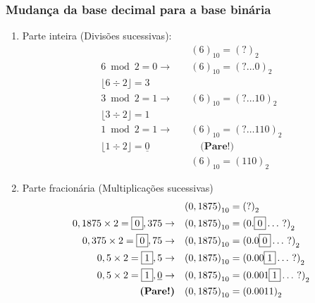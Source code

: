 \documentclass[a4paper,oneside,article,table]{article}
\begin{document}
    \subsubsection{Mudança da base decimal para a base binária}
        \begin{enumerate}

            \item Parte inteira (Divisões sucessivas):
                \begin{align*}
                    &{(6)}_{10} = {(?)}_2\\
                    6 \bmod 2 = \boxed{0} \rightarrow \quad &{(6)}_{10} = {(? \ldots \boxed{0})}_2\\
                    \lfloor  6 \div 2 \rfloor = 3 \quad &\\
                    3 \bmod 2 = \boxed{1} \rightarrow \quad &{(6)}_{10} = {(? \ldots \boxed{1}0)}_2\\
                    \lfloor  3 \div 2 \rfloor = 1 \quad &\\
                    1 \bmod 2 = \boxed{1} \rightarrow \quad &{(6)}_{10} = {(? \ldots \boxed{1}10)}_2\\
                    \lfloor  1 \div 2 \rfloor = \underline{0} \quad & \quad \textbf{(Pare!)} \\
                    &{(6)}_{10} = {(110)}_2
                \end{align*}

            \item Parte fracionária (Multiplicações sucessivas)
                \begin{align*}
                    &{(0,1875)}_{10} = {(?)}_2\\
                    0,1875 \times 2 = \boxed{0},375 \rightarrow \quad &{(0,1875)}_{10} = {(0.\boxed{0}\ldots~?)}_2\\
                    0,375 \times 2 = \boxed{0},75 \rightarrow \quad &{(0,1875)}_{10} = {(0.0\boxed{0}\ldots~?)}_2\\
                    0,5 \times 2 = \boxed{1},5 \rightarrow \quad &{(0,1875)}_{10} = {(0.00\boxed{1}\ldots~?)}_2\\
                    0,5 \times 2 = \boxed{1},\underline{0} \rightarrow \quad &{(0,1875)}_{10} = {(0.001\boxed{1}\ldots~?)}_2\\
                    \textrm{\textbf{(Pare!)}} \quad &{(0,1875)}_{10} = {(0.0011)}_2
                \end{align*}
                

\end{enumerate}
\end{document}
